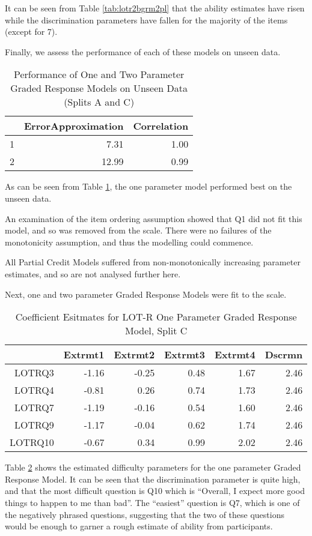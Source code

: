 \documentclass{article}
\begin{document}
It can be seen from Table \ref{tab:lotr2bgrm2pl} that the ability estimates have risen while the discrimination parameters have fallen for the majority of the items (except for 7). 


Finally, we assess the performance of each of these models on unseen data. 


\begin{table}[ht]
\centering
\begin{tabular}{rrr}
  \hline
 & ErrorApproximation & Correlation \\ 
  \hline
1 & 7.31 & 1.00 \\ 
  2 & 12.99 & 0.99 \\ 
   \hline
\end{tabular}
\caption{Performance of One and Two Parameter Graded Response Models on Unseen Data (Splits A and C)} 
\label{tab:lotr2bgrmtest}
\end{table}
As can be seen from Table \ref{tab:lotr2bgrmtest}, the one parameter model performed best on the unseen data. 



An examination of the item ordering assumption showed that Q1 did not fit this model, and so was removed from the scale. There were no failures of the monotonicity assumption, and thus the modelling could commence. 



All Partial Credit Models suffered from non-monotonically increasing parameter estimates, and so are not analysed further here. 

Next, one and two parameter Graded Response Models were fit to the scale.


\begin{table}[ht]
\centering
\begin{tabular}{rrrrrr}
  \hline
 & Extrmt1 & Extrmt2 & Extrmt3 & Extrmt4 & Dscrmn \\ 
  \hline
LOTRQ3 & -1.16 & -0.25 & 0.48 & 1.67 & 2.46 \\ 
  LOTRQ4 & -0.81 & 0.26 & 0.74 & 1.73 & 2.46 \\ 
  LOTRQ7 & -1.19 & -0.16 & 0.54 & 1.60 & 2.46 \\ 
  LOTRQ9 & -1.17 & -0.04 & 0.62 & 1.74 & 2.46 \\ 
  LOTRQ10 & -0.67 & 0.34 & 0.99 & 2.02 & 2.46 \\ 
   \hline
\end{tabular}
\caption{Coefficient Esitmates for LOT-R One Parameter Graded Response Model, Split C} 
\label{tab:lotr2cgrm1pl}
\end{table}
Table \ref{tab:lotr2cgrm1pl} shows the estimated difficulty parameters for the one parameter Graded Response Model. It can be seen that the discrimination parameter is quite high, and that the most difficult question is Q10 which is ``Overall, I expect more good things to happen to me than bad''. The ``easiest'' question is Q7, which is one of the negatively phrased questions, suggesting that the two of these questions would be enough to garner a rough estimate of ability from participants. 
\end{document}
